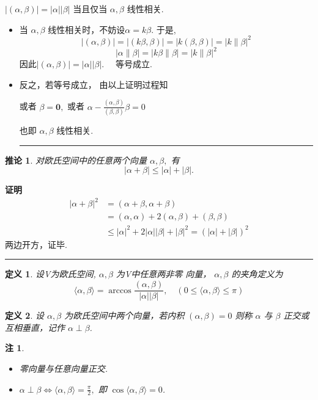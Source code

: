 \documentclass[13pt]{beamer}
\newtheorem*{defi}{定义}
\newtheorem*{coro}{推论}
\newtheorem*{rem}{注}
\def\qed{\nopagebreak\hfill{\rule{4pt}{7pt}}\medbreak}
\def\pf{{\bf 证明~~ }}
\def\0{\mathbf{0}}
\begin{document}
\begin{frame}
\begin{center}
$| \left(\alpha, \beta \right) | = |\alpha|    | \beta|
$
当且仅当 $\alpha, \beta$ 线性相关.
\end{center}


\begin{itemize}
\item 
当
$\alpha, \beta$ 线性相关时，不妨设$\alpha=k \beta$.
于是, $$|(\alpha, \beta)|=|(k \beta, \beta)|=|k(\beta, \beta)|=|k \| {\beta}|^{2}$$
$$
|\alpha\|\beta|=| k \beta\| \beta|=|k \| \beta|^{2}
$$
因此$|(\alpha, \beta)|=|\alpha||\beta| . \quad$ 等号成立.

\item 
反之，若等号成立，
由以上证明过程知

或者 $\beta=\0,$ 或者 $\alpha-\frac{(\alpha, \beta)}{(\beta, \beta)} \beta=0$

也即 $\alpha, \beta$ 线性相关.
\qed
\end{itemize}
\end{frame}


\begin{frame}
\begin{coro}
对欧氏空间中的任意两个向量 $\alpha, \beta,$ 有
$$|\alpha+\beta| \leq|\alpha|+|\beta|. $$
\end{coro}
\pf 
\[
\begin{aligned}
|\alpha+\beta|^{2}& =(\alpha+\beta, \alpha+\beta) \\
\quad& =(\alpha, \alpha)+2(\alpha, \beta)+(\beta, \beta) \\
\quad & \leq|\alpha|^{2}+2|\alpha||\beta|+|\beta|^{2}=(|\alpha|+|\beta|)^{2}
\end{aligned}
\]
两边开方，证毕.
\qed
\end{frame}




\begin{frame}
\begin{defi}
	设V为欧氏空间, $\alpha, \beta$ 为V中任意两非零
向量， 
$\alpha, \beta$ 的夹角定义为
\[
\langle\alpha, \beta\rangle=\arccos \frac{(\alpha, \beta)}{|\alpha||\beta|},
\quad
(0 \leq\langle\alpha, \beta\rangle \leq \pi)
\]
\end{defi}
%
\begin{defi}
	设 $\alpha, \beta$ 为欧氏空间中两个向量，若内积
$
(\alpha, \beta)=0
$
则称 $\alpha$ 与 $\beta$ 正交或互相垂直，记作 $\alpha \perp \beta$.
\end{defi}
\begin{rem}
	\begin{itemize}
		\item 零向量与任意向量正交.
		 \item $\alpha \perp \beta \Longleftrightarrow\langle\alpha, \beta\rangle=\frac{\pi}{2},$ 即 $\cos \langle\alpha, \beta\rangle=0$.
	\end{itemize}
\end{rem}

\end{frame}
\end{document}
